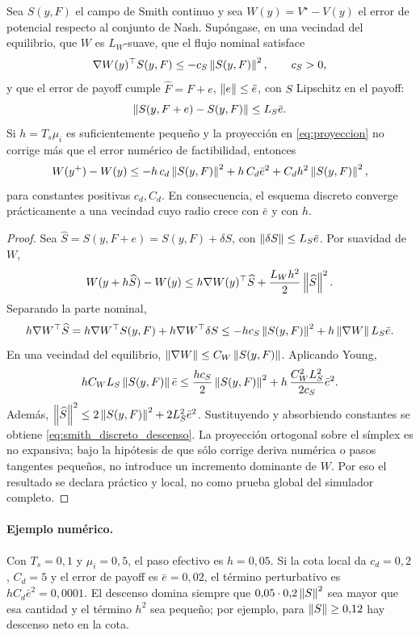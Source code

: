 \begin{proposicion}
\label{prop:smith_discreto_practico}
Sea $S(y,F)$ el campo de Smith continuo y sea $W(y)=V^\star-V(y)$ el error de
potencial respecto al conjunto de Nash. Supóngase, en una vecindad del equilibrio, que
$W$ es $L_W$-suave, que el flujo nominal satisface
\[
  \nabla W(y)^\top S(y,F)\le -c_S\left\|S(y,F)\right\|^2,
  \qquad c_S>0,
\]
y que el error de payoff cumple $\widehat F=F+e$, $\left\|e\right\|\le\bar e$, con
$S$ Lipschitz en el payoff:
\[
  \left\|S(y,F+e)-S(y,F)\right\|\le L_S\bar e.
\]
Si $h=T_s\mu_i$ es suficientemente pequeño y la proyección en
\eqref{eq:proyeccion} no corrige más que el error numérico de factibilidad, entonces
\begin{equation}
  W(y^{+})-W(y)
  \le
  -h\,c_d\left\|S(y,F)\right\|^2
  +
  h\,C_d\bar e^2
  +
  C_dh^2\left\|S(y,F)\right\|^2,
  \label{eq:smith_discreto_descenso}
\end{equation}
para constantes positivas $c_d,C_d$. En consecuencia, el esquema discreto converge
prácticamente a una vecindad cuyo radio crece con $\bar e$ y con $h$.
\end{proposicion}

\begin{proof}
Sea $\widehat S=S(y,F+e)=S(y,F)+\delta S$, con
$\left\|\delta S\right\|\le L_S\bar e$. Por suavidad de $W$,
\[
  W(y+h\widehat S)-W(y)
  \le
  h\nabla W(y)^\top \widehat S
  +
  \frac{L_W h^2}{2}\left\|\widehat S\right\|^2.
\]
Separando la parte nominal,
\[
  h\nabla W^\top \widehat S
  =
  h\nabla W^\top S(y,F)+h\nabla W^\top\delta S
  \le
  -hc_S\left\|S(y,F)\right\|^2+h\left\|\nabla W\right\|L_S\bar e.
\]
En una vecindad del equilibrio, $\left\|\nabla W\right\|\le C_W\left\|S(y,F)\right\|$. Aplicando Young,
\[
  h C_WL_S\left\|S(y,F)\right\|\bar e
  \le
  \frac{hc_S}{2}\left\|S(y,F)\right\|^2
  +
  h\,\frac{C_W^2L_S^2}{2c_S}\bar e^2.
\]
Además, $\left\|\widehat S\right\|^2\le2\left\|S(y,F)\right\|^2+2L_S^2\bar e^2$. Sustituyendo y
absorbiendo constantes se obtiene \eqref{eq:smith_discreto_descenso}. La proyección
ortogonal sobre el símplex es no expansiva; bajo la hipótesis de que sólo corrige
deriva numérica o pasos tangentes pequeños, no introduce un incremento dominante de
$W$. Por eso el resultado se declara práctico y local, no como prueba global del
simulador completo.
\end{proof}

\paragraph{Ejemplo numérico.}
Con $T_s=0{,}1$ y $\mu_i=0{,}5$, el paso efectivo es $h=0{,}05$. Si la cota local da
$c_d=0{,}2$, $C_d=5$ y el error de payoff es $\bar e=0{,}02$, el término perturbativo
es $hC_d\bar e^2=0{,}0001$. El descenso domina siempre que
$0{,}05\cdot0{,}2\left\|S\right\|^2$ sea mayor que esa cantidad y el término $h^2$ sea pequeño;
por ejemplo, para $\left\|S\right\|\ge0{,}12$ hay descenso neto en la cota.


